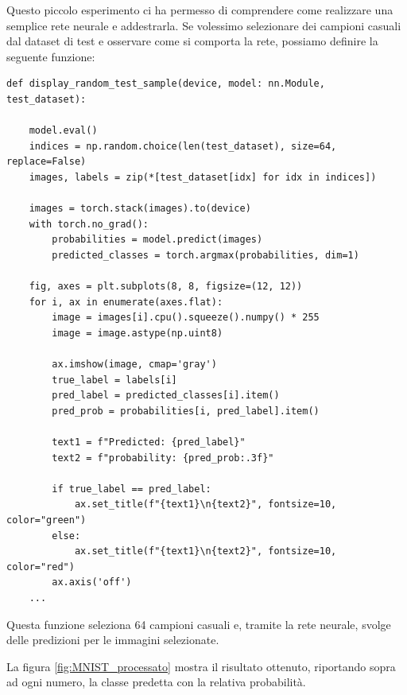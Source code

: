 Questo piccolo esperimento ci ha permesso di comprendere come 
realizzare una semplice rete neurale e addestrarla.
Se volessimo selezionare dei campioni casuali dal dataset di test e osservare come 
si comporta la rete, possiamo definire la seguente funzione:
\begin{lstlisting}
def display_random_test_sample(device, model: nn.Module, test_dataset):
    
    model.eval()
    indices = np.random.choice(len(test_dataset), size=64, replace=False)
    images, labels = zip(*[test_dataset[idx] for idx in indices])

    images = torch.stack(images).to(device)
    with torch.no_grad():
        probabilities = model.predict(images)
        predicted_classes = torch.argmax(probabilities, dim=1)

    fig, axes = plt.subplots(8, 8, figsize=(12, 12))
    for i, ax in enumerate(axes.flat):
        image = images[i].cpu().squeeze().numpy() * 255
        image = image.astype(np.uint8)

        ax.imshow(image, cmap='gray')
        true_label = labels[i]
        pred_label = predicted_classes[i].item()
        pred_prob = probabilities[i, pred_label].item()
        
        text1 = f"Predicted: {pred_label}"
        text2 = f"probability: {pred_prob:.3f}"

        if true_label == pred_label:
            ax.set_title(f"{text1}\n{text2}", fontsize=10, color="green")
        else:
            ax.set_title(f"{text1}\n{text2}", fontsize=10, color="red")
        ax.axis('off')
    ...
\end{lstlisting}
Questa funzione seleziona 64 campioni casuali e, tramite la rete neurale, svolge delle 
predizioni per le immagini selezionate.

La figura \ref{fig:MNIST_processato} mostra il risultato ottenuto, riportando sopra ad ogni
numero, la classe predetta con la relativa probabilità.

